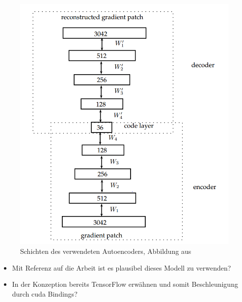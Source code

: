 \begin{figure}
	\centering
	\includegraphics[scale=0.6]{images/ae_model.png}
	\caption{Schichten des verwendeten Autoencoders, Abbildung aus \cite{aed2016}}
	\label{img:ae_model}
\end{figure}

\begin{itemize}
	\item Mit Referenz auf die Arbeit ist es plausibel dieses Modell zu verwenden?
	\item In der Konzeption bereits TensorFlow erwähnen und somit Beschleunigung durch cuda Bindings?
\end{itemize}